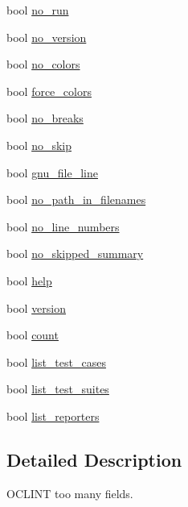 \begin{DoxyCompactItemize}
\item 
bool \hyperlink{structdoctest_1_1ContextOptions_aad35f517c65f792ddc72a672d9014222}{no\+\_\+run}
\item 
bool \hyperlink{structdoctest_1_1ContextOptions_ad7371979d5134b109dd00fba771b0271}{no\+\_\+version}
\item 
bool \hyperlink{structdoctest_1_1ContextOptions_a4fc9b6673b818b8cb5969725f16b59c3}{no\+\_\+colors}
\item 
bool \hyperlink{structdoctest_1_1ContextOptions_a8cd276e86a209f3d5486eb6c5a2a29bf}{force\+\_\+colors}
\item 
bool \hyperlink{structdoctest_1_1ContextOptions_af82a6fc802b8ed33a84ea96e85b0d911}{no\+\_\+breaks}
\item 
bool \hyperlink{structdoctest_1_1ContextOptions_a56344ffa781ee4da6cbf3f6c11da8564}{no\+\_\+skip}
\item 
bool \hyperlink{structdoctest_1_1ContextOptions_aab894e731a6fc86cf095288ec7d0c0f2}{gnu\+\_\+file\+\_\+line}
\item 
bool \hyperlink{structdoctest_1_1ContextOptions_a1e9a8bf8feba5cfe25558e5977c4bd7c}{no\+\_\+path\+\_\+in\+\_\+filenames}
\item 
bool \hyperlink{structdoctest_1_1ContextOptions_a880207c3b4cc98fc5c8d94998841e837}{no\+\_\+line\+\_\+numbers}
\item 
bool \hyperlink{structdoctest_1_1ContextOptions_a4e22eec59e63ed4ff6ab4dfce2389c99}{no\+\_\+skipped\+\_\+summary}
\item 
bool \hyperlink{structdoctest_1_1ContextOptions_a9d542a95ee03f61c233fff51e7461400}{help}
\item 
bool \hyperlink{structdoctest_1_1ContextOptions_a08931527a9e5e634e64a336e5493a7c1}{version}
\item 
bool \hyperlink{structdoctest_1_1ContextOptions_a4651b5efbaf2ffc03d60fb4140d21dd3}{count}
\item 
bool \hyperlink{structdoctest_1_1ContextOptions_a813e1543c358ab8a7a432b4ad2b32e56}{list\+\_\+test\+\_\+cases}
\item 
bool \hyperlink{structdoctest_1_1ContextOptions_a579399a66b278cbf96b6183d337f486b}{list\+\_\+test\+\_\+suites}
\item 
bool \hyperlink{structdoctest_1_1ContextOptions_ad3daf077ac3182db5175f8baff49fce0}{list\+\_\+reporters}
\end{DoxyCompactItemize}


\subsection{Detailed Description}
O\+C\+L\+I\+NT too many fields. 

